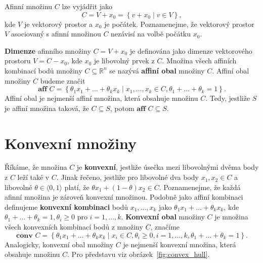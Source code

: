 \noindent Afinní množinu $C$ lze vyjádřit jako
$$
    C = V + x_0 = \left\{ v + x_0 \mid v \in V \right\},
$$
kde $V$ je vektorový prostor a $x_0$ je počátek. Poznamenejme, že vektorový prostor $V$ asociovaný s afinní množinou $C$ nezávisí na volbě počátku $x_0$.

\noindent \textbf{Dimenze} afinního množiny $C = V + x_0$ je definována jako dimenze vektorového prostoru $V = C - x_0$, kde $x_0$ je libovolný prvek z $C$. Množina všech affiních kombinací bodů množiny $C \subseteq \mathbb{R}^n$ se nazývá \textbf{affiní obal} množiny $C$. Affiní obal množiny $C$ budeme značit
$$
    \textbf{aff } C = \left\{ \theta_1 x_1 + \dots + \theta_k x_k \mid x_1, \dots, x_k \in C, \theta_1 + \dots + \theta_k = 1 \right\}.
$$
Affiní obal je nejmenší affiní množina, která obsahuje množinu $C$. Tedy, jestliže $S$ je affiní množina taková, že $C \subseteq S$, potom $\textbf{aff }C \subseteq S$.


\section{Konvexní množiny}

Říkáme, že množina $C$ je \textbf{konvexní}, jestliže úsečka mezi libovolnými dvěma body z $C$ leží také v $C$. Jinak řečeno, jestliže pro libovolné dva body $x_1, x_2 \in C$ a libovolné $\theta \in \langle 0, 1 \rangle$ platí, že $\theta x_1 + (1 - \theta) x_2 \in C$. Poznamenejme, že každá afinní množina je zároveň konvexní množinou. Podobně jako affiní kombinaci definujeme \textbf{konvexní kombinaci} bodů $x_1, \dots, x_k$ jako $\theta_1 x_1 + \dots + \theta_k x_k$, kde $\theta_1 + \dots + \theta_k = 1, \theta_i \geq 0$ pro $i = 1, \dots, k$. \textbf{Konvexní obal} množiny $C$ je množina všech konvexních kombinací bodů z množiny $C$, značíme
$$
    \textbf{conv }C = \left\{ \theta_1 x_1 + \dots + \theta_k x_k \mid x_i \in C, \theta_i \geq 0, i = 1, \dots, k, \theta_1 + \dots + \theta_k = 1 \right\}.
$$
Analogicky, konvexní obal množiny $C$ je nejmenší konvexní množina, která obsahuje množinu $C$. Pro představu viz obrázek~\ref{fig:convex_hull}.

